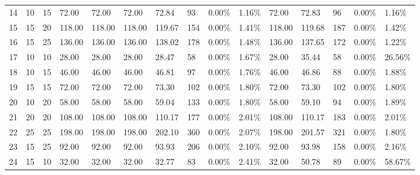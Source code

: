 \begin{longtable}{l|ll|ll|lllll|lllll}
  14 & 10                         & 15                         & 72.00                     & 72.00       & 72.00         & 72.84  & 93  & 0.00\%  & 1.16\% & 72.00  & 72.83  & 96  & 0.00\%  & 1.16\%  \\
  15 & 15                         & 20                         & 118.00                    & 118.00      & 118.00        & 119.67 & 154 & 0.00\%  & 1.41\% & 118.00 & 119.68 & 187 & 0.00\%  & 1.42\%  \\
  16 & 15                         & 25                         & 136.00                    & 136.00      & 136.00        & 138.02 & 178 & 0.00\%  & 1.48\% & 136.00 & 137.65 & 172 & 0.00\%  & 1.22\%  \\
  17 & 10                         & 10                         & 28.00                     & 28.00       & 28.00         & 28.47  & 58  & 0.00\%  & 1.67\% & 28.00  & 35.44  & 58  & 0.00\%  & 26.56\% \\
  18 & 10                         & 15                         & 46.00                     & 46.00       & 46.00         & 46.81  & 97  & 0.00\%  & 1.76\% & 46.00  & 46.86  & 88  & 0.00\%  & 1.88\%  \\
  19 & 15                         & 15                         & 72.00                     & 72.00       & 72.00         & 73.30  & 102 & 0.00\%  & 1.80\% & 72.00  & 73.30  & 102 & 0.00\%  & 1.80\%  \\
  20 & 10                         & 20                         & 58.00                     & 58.00       & 58.00         & 59.04  & 133 & 0.00\%  & 1.80\% & 58.00  & 59.10  & 94  & 0.00\%  & 1.89\%  \\
  21 & 20                         & 20                         & 108.00                    & 108.00      & 108.00        & 110.17 & 177 & 0.00\%  & 2.01\% & 108.00 & 110.17 & 183 & 0.00\%  & 2.01\%  \\
  22 & 25                         & 25                         & 198.00                    & 198.00      & 198.00        & 202.10 & 360 & 0.00\%  & 2.07\% & 198.00 & 201.57 & 321 & 0.00\%  & 1.80\%  \\
  23 & 15                         & 25                         & 92.00                     & 92.00       & 92.00         & 93.93  & 206 & 0.00\%  & 2.10\% & 92.00  & 93.98  & 158 & 0.00\%  & 2.16\%  \\
  24 & 15                         & 10                         & 32.00                     & 32.00       & 32.00         & 32.77  & 83  & 0.00\%  & 2.41\% & 32.00  & 50.78  & 89  & 0.00\%  & 58.67\% \\

\end{longtable}

